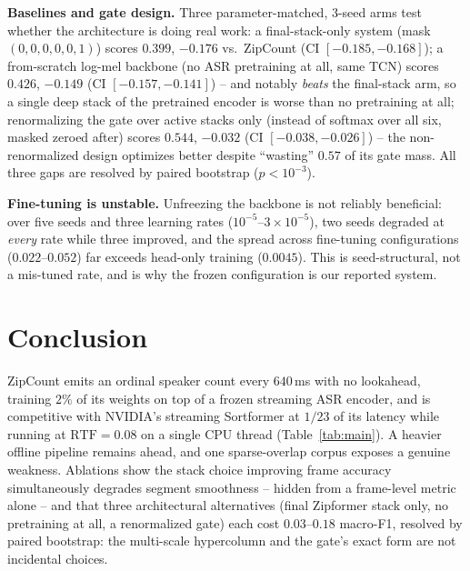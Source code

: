 \documentclass[10pt,conference]{IEEEtran}
\newcommand{\sys}{ZipCount}
\begin{document}
\textbf{Baselines and gate design.} Three parameter-matched, 3-seed arms
test whether the architecture is doing real work: a final-stack-only system
(mask $(0,0,0,0,0,1)$) scores $0.399$, $-0.176$ vs.\ \sys{} (CI
$[-0.185,-0.168]$); a from-scratch log-mel backbone (no ASR pretraining at
all, same TCN) scores $0.426$, $-0.149$ (CI $[-0.157,-0.141]$) -- and
notably \emph{beats} the final-stack arm, so a single deep stack of the
pretrained encoder is worse than no pretraining at all; renormalizing the
gate over active stacks only (instead of softmax over all six, masked
zeroed after) scores $0.544$, $-0.032$ (CI $[-0.038,-0.026]$) -- the
non-renormalized design optimizes better despite ``wasting'' $0.57$ of its
gate mass. All three gaps are resolved by paired bootstrap ($p<10^{-3}$).

\textbf{Fine-tuning is unstable.} Unfreezing the backbone is not reliably
beneficial: over five seeds and three learning rates
($10^{-5}$--$3\!\times\!10^{-5}$), two seeds degraded at \emph{every} rate
while three improved, and the spread across fine-tuning configurations
($0.022$--$0.052$) far exceeds head-only training ($0.0045$). This is
seed-structural, not a mis-tuned rate, and is why the frozen configuration
is our reported system.

\section{Conclusion}

\sys{} emits an ordinal speaker count every $640$\,ms with no lookahead,
training $2\%$ of its weights on top of a frozen streaming ASR encoder, and
is competitive with NVIDIA's streaming Sortformer at $1/23$ of its latency
while running at $\mathrm{RTF}=0.08$ on a single CPU thread (Table~\ref{tab:main}).
A heavier offline pipeline remains ahead, and one sparse-overlap corpus
exposes a genuine weakness. Ablations show the stack choice improving frame
accuracy simultaneously degrades segment smoothness -- hidden from a
frame-level metric alone -- and that three architectural alternatives
(final Zipformer stack only, no pretraining at all, a renormalized gate)
each cost $0.03$--$0.18$ macro-F1, resolved by paired bootstrap: the
multi-scale hypercolumn and the gate's exact form are not incidental
choices.



\end{document}
